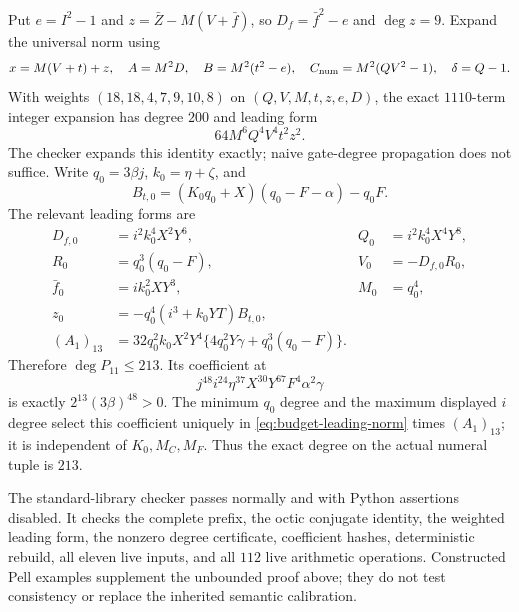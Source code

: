 Put $e=I^2-1$ and $z=\bar Z-M(V+\bar f)$, so
$D_f=\bar f^2-e$ and $\deg z=9$.
Expand the universal norm using
\[
 x=M(V+t)+z,\quad A=M^2D,\quad B=M^2(t^2-e),\quad
 C_{\rm num}=M^2(QV^2-1),\quad\delta=Q-1.
\]
With weights $(18,18,4,7,9,10,8)$ on $(Q,V,M,t,z,e,D)$,
the exact $1110$-term integer expansion has degree $200$ and leading form
\begin{equation}
 64M^6Q^4V^4t^2z^2.
 \label{eq:budget-leading-norm}
\end{equation}
The checker expands this identity exactly; naive gate-degree propagation
does not suffice.  Write $q_0=3\beta j$, $k_0=\eta+\zeta$, and
\[
 B_{t,0}=(K_0q_0+X)(q_0-F-\alpha)-q_0F.
\]
The relevant leading forms are
\begin{align*}
 D_{f,0}&=i^2k_0^4X^2Y^6,&Q_0&=i^2k_0^4X^4Y^8,\\
 R_0&=q_0^3(q_0-F),&V_0&=-D_{f,0}R_0,\\
 \bar f_0&=ik_0^2XY^3,&M_0&=q_0^4,\\
 z_0&=-q_0^4(i^3+k_0YT)B_{t,0},\\
 (A_1)_{13}&=32q_0^2k_0X^2Y^4
       \{4q_0^2Y\gamma+q_0^3(q_0-F)\}.
\end{align*}
Therefore $\deg P_{11}\le213$.  Its coefficient at
\[
 j^{48}i^{24}\eta^{37}X^{30}Y^{67}F^4\alpha^2\gamma
\]
is exactly $2^{13}(3\beta)^{48}>0$.  The minimum $q_0$ degree and
the maximum displayed $i$ degree select this coefficient uniquely in
\eqref{eq:budget-leading-norm} times $(A_1)_{13}$; it is independent of
$K_0,M_C,M_F$.  Thus the exact degree on the actual numeral tuple is
$213$.

The standard-library checker passes normally and with Python assertions
disabled.  It checks the complete prefix, the octic conjugate identity,
the weighted leading form, the nonzero degree certificate, coefficient
hashes, deterministic rebuild, all eleven live inputs, and all $112$
live arithmetic operations.  Constructed Pell examples supplement the
unbounded proof above; they do not test consistency or replace the
inherited semantic calibration.
